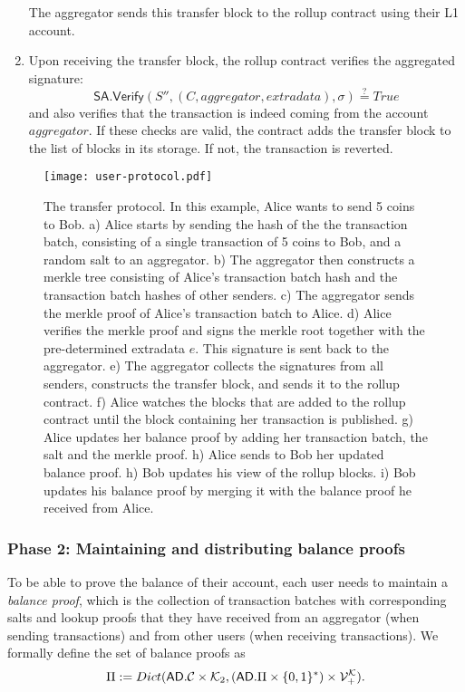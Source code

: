 \begin{enumerate}
  The aggregator sends this transfer block to the rollup contract using their L1 account.
  \item Upon receiving the transfer block, the rollup contract verifies the aggregated signature: \[\mathsf{SA.Verify}(S'',(C,aggregator,extradata),\sigma) \stackrel{?}{=} True\] and also verifies that the transaction is indeed coming from the account \(aggregator\). If these checks are valid, the contract adds the transfer block to the list of blocks in its storage. If not, the transaction is reverted.
\end{enumerate}

  \begin{figure}

\centering
\texttt{[image: user-protocol.pdf]}
    \caption{The transfer protocol. In this example, Alice wants to send 5 coins to Bob. a) Alice starts by sending the hash of the the transaction batch, consisting of a single transaction of 5 coins to Bob, and a random salt to an aggregator. b) The aggregator then constructs a merkle tree consisting of Alice's transaction batch hash and the transaction batch hashes of other senders. c) The aggregator sends the merkle proof of Alice's transaction batch to Alice. d) Alice verifies the merkle proof and signs the merkle root together with the pre-determined extradata \(e\). This signature is sent back to the aggregator. e) The aggregator collects the signatures from all senders, constructs the transfer block, and sends it to the rollup contract. f) Alice watches the blocks that are added to the rollup contract until the block containing her transaction is published. g) Alice updates her balance proof by adding her transaction batch, the salt and the merkle proof. h) Alice sends to Bob her updated balance proof. h) Bob updates his view of the rollup blocks. i) Bob updates his balance proof by merging it with the balance proof he received from Alice.}
\label{fig:user-protocol}
\end{figure}

\subsubsection{Phase 2: Maintaining and distributing balance proofs}

To be able to prove the balance of their account, each user needs to maintain a \emph{balance proof}, which is the collection of transaction batches with corresponding salts and lookup proofs that they have received from an aggregator (when sending transactions) and from other users (when receiving transactions). We formally define \href{https://github.com/\repo FVIntmax/BalanceProof.lean#L27}{\ExternalLink} the set of balance proofs as \[\Pi := Dict(\mathsf{AD}.\mathcal{C} \times \mathcal{K}_2, (\mathsf{AD}.\Pi \times \{0,1\}^*) \times \mathcal{V}_+^{\mathcal{K}}).\]

